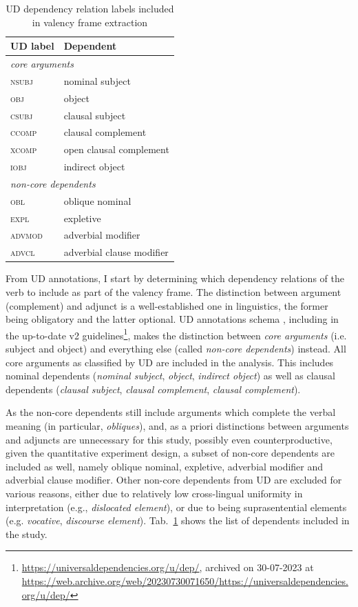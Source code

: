 \begin{table}
  \centering
  \begin{tabular}{ll}
    \toprule
    \textbf{UD label} & \textbf{Dependent} \\
    \midrule
    \multicolumn{2}{l}{\textit{core arguments}} \\
    \textsc{nsubj} & nominal subject \\
    \textsc{obj} & object \\
    \textsc{csubj} & clausal subject \\
    \textsc{ccomp} & clausal complement \\
    \textsc{xcomp}   & open clausal complement \\
    \textsc{iobj} & indirect object \\
    \midrule
    \multicolumn{2}{l}{\textit{non-core dependents}} \\
    \textsc{obl} & oblique nominal \\
    \textsc{expl} & expletive \\
    \textsc{advmod} & adverbial modifier \\
    \textsc{advcl} & adverbial clause modifier \\
    \bottomrule
  \end{tabular}
  \caption{UD dependency relation labels included in valency frame extraction}\label{tab:ud-dependent-labels}
\end{table}

From UD annotations, I start by determining which dependency relations of the verb to include as part of the valency frame. The distinction between argument (complement) and adjunct is a well-established one in linguistics, the former being obligatory and the latter optional. UD annotations schema \citep{demarneffe2014}, including in the up-to-date v2 guidelines\footnote{\url{https://universaldependencies.org/u/dep/}, archived on 30-07-2023 at \url{https://web.archive.org/web/20230730071650/https://universaldependencies.org/u/dep/}}, makes the distinction between \textit{core arguments} (i.e. subject and object) and everything else (called \textit{non-core dependents}) instead. All core arguments as classified by UD are included in the analysis. This includes nominal dependents (\textit{nominal subject}, \textit{object}, \textit{indirect object}) as well as clausal dependents (\textit{clausal subject}, \textit{clausal complement}, \textit{clausal complement}). 

As the non-core dependents still include arguments which complete the verbal meaning (in particular, \textit{obliques}), and, as a priori distinctions between arguments and adjuncts are unnecessary for this study, possibly even counterproductive, given the quantitative experiment design, a subset of non-core dependents are included as well, namely oblique nominal, expletive, adverbial modifier and adverbial clause modifier. Other non-core dependents from UD are excluded for various reasons, either due to relatively low cross-lingual uniformity in interpretation (e.g., \textit{dislocated element}), or due to being suprasentential elements (e.g. \textit{vocative}, \textit{discourse element}). Tab.~\ref{tab:ud-dependent-labels} shows the list of dependents included in the study.

